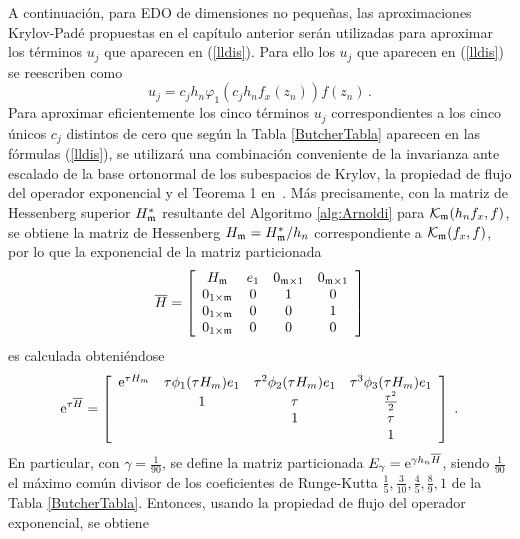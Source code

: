 A continuación, para EDO de dimensiones no pequeñas, las aproximaciones Krylov-Padé propuestas en el capítulo anterior serán utilizadas para aproximar los términos $u_j$ que aparecen en (\ref{lldis}). Para ello los $u_j$ que aparecen en (\ref{lldis}) se reescriben como
\begin{equation}
	u_j= c_jh_n\varphi_1(c_jh_nf_x(z_n))f(z_n) \label{u-j-deff}\,.
\end{equation}
 Para aproximar eficientemente los cinco términos $u_j$ correspondientes a los cinco únicos $c_j$ distintos de cero que según la Tabla \ref{ButcherTabla} aparecen en las fórmulas (\ref{lldis}), se utilizará una combinación conveniente de la invarianza ante escalado de la base ortonormal de los subespacios de Krylov, la propiedad de flujo del operador exponencial y el Teorema 1 en~\cite{sidje1998expokit}. Más precisamente, con la matriz de Hessenberg superior $H^*_{\mathfrak{m}}$ resultante del Algoritmo \ref{alg:Arnoldi} para $\mathcal{K}_{\mathfrak{m}}(h_nf_x,f)$, se obtiene la matriz de Hessenberg $H_{\mathfrak{m}}=H^*_{\mathfrak{m}}/h_n$ correspondiente a $\mathcal{K}_{\mathfrak{m}}(f_x,f)$, por lo que la exponencial de la matriz particionada
\begin{equation}
    \overline{H} = \left[\begin{array}{cccc}
    H_{\mathfrak{m}} & e_1 & 0_{\mathfrak{m}\times 1} & 0_{\mathfrak{m}\times 1}\\
    0_{1\times\mathfrak{m}} & 0 & 1 & 0\\
    0_{1\times\mathfrak{m}} & 0 & 0 & 1\\
    0_{1\times\mathfrak{m}} & 0 & 0 & 0
    \end{array}\right] \label{hhat}
\end{equation}
es calculada obteniéndose
\begin{equation}
    \mathrm{e}^{\tau\overline{H}} = \left[\begin{array}{cccc}
    \mathrm{e}^{\tau H_m} & \tau\phi_1(\tau H_m)e_1 & \tau^{2}\phi_2(\tau H_m)e_1 &
    \tau^{3}\phi_3(\tau H_m)e_1 \\
    & 1 & \tau & \frac{\tau^{2}}{2}\\
    &  & 1 & \tau \\
    &   &   & 1 \\
    \end{array}\right]\;. \label{phi_hhat}
\end{equation}
En particular, con $\gamma=\frac{1}{90}$, se define la matriz particionada $E_\gamma=\mathrm{e}^{\gamma h_n\overline{H}}$, siendo $\frac{1}{ 90}$ el máximo común divisor de los coeficientes de Runge-Kutta $\frac{1}{5},\frac{3}{10},\frac{4}{5},\frac{8}{9} ,1$ de la Tabla \ref{ButcherTabla}. Entonces, usando la propiedad de flujo del operador exponencial, se obtiene

